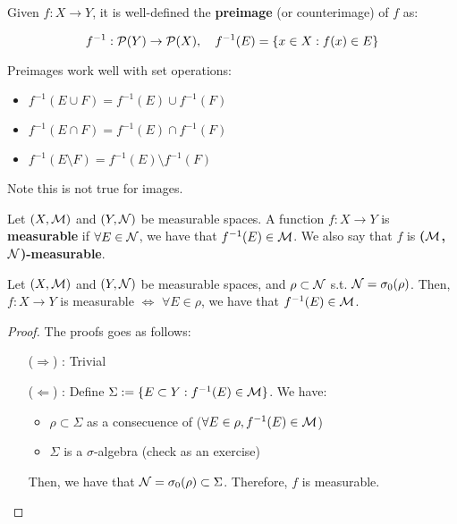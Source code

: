 \begin{fdefinition}
    Given $f: X \to Y$, it is well-defined the \textbf{preimage} (or 
    counterimage) of $f$ as:

    $$f^{-1}: \mathcal{P}(Y) \to \mathcal{P}(X), \quad f^{-1}(E) = \{x \in X: f(x) \in E\}$$
\end{fdefinition}

\begin{fremark}
    Preimages work well with set operations:
    \begin{itemize}
        \item $f^{-1}(E \cup F) = f^{-1}(E) \cup f^{-1}(F)$
        \item $f^{-1}(E \cap F) = f^{-1}(E) \cap f^{-1}(F)$
        \item $f^{-1}(E \setminus F) = f^{-1}(E) \setminus f^{-1}(F)$
    \end{itemize}

    Note this is not true for images.
\end{fremark}

\vspace{1em}

\begin{fdefinition}
    Let $(X, \mathcal{M})$ and $(Y, \mathcal{N})$ be measurable spaces. A function $f: X \to Y$ is 
    \textbf{measurable} if $\forall E \in \mathcal{N}$, we have that $f^{-1}(E) \in \mathcal{M}$.
    We also say that $f$ is \textbf{($\mathcal{M}$,$\mathcal{N}$)-measurable}.
\end{fdefinition}

\vspace{1em}

\begin{fproposition}
    Let $(X, \mathcal{M})$ and $(Y, \mathcal{N})$ be measurable spaces, and $\rho \subset \mathcal{N}$ s.t.
    $\mathcal{N} = \sigma_0(\rho)$. Then, $f: X \to Y$ is measurable $\iff$ $\forall E \in \rho$,
    we have that $f^{-1}(E) \in \mathcal{M}$.
\end{fproposition}

\begin{proof}
    The proofs goes as follows:

    \begin{itemize}
        \item[($\Rightarrow$)]: Trivial
        \item[($\Leftarrow$)]:
        Define $\Sigma := \{E \subset Y: f^{-1}(E) \in \mathcal{M}\}$. We have:

        \begin{itemize}[label=$\bullet$]
            \item $\rho \subset \Sigma$ as a consecuence of ($\forall E \in \rho, f^{-1}(E) \in \mathcal{M}$)
            \item $\Sigma$ is a $\sigma$-algebra (check as an exercise)
        \end{itemize}

        Then, we have that $\mathcal{N} = \sigma_0(\rho) \subset \Sigma$. Therefore, $f$ is measurable. 

    \end{itemize}
\end{proof}

